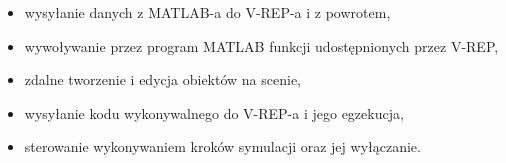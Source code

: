 \documentclass[11pt, a4paper, twoside]{article}
\begin{document}
	\begin{itemize}
		\item wysyłanie danych z MATLAB-a do V-REP-a i z powrotem,
		\item wywoływanie przez program MATLAB funkcji udostępnionych przez V-REP,
		\item zdalne tworzenie i edycja obiektów na scenie,
		\item wysyłanie kodu wykonywalnego do V-REP-a i jego egzekucja,
		\item sterowanie wykonywaniem kroków symulacji oraz jej wyłączanie.
	\end{itemize}
	
	
\end{document}
